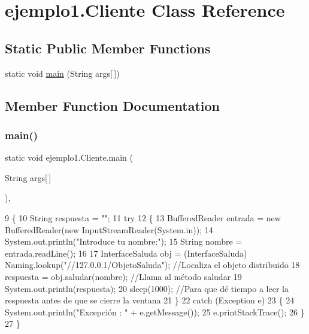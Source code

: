\hypertarget{classejemplo1_1_1_cliente}{}\section{ejemplo1.\+Cliente Class Reference}
\label{classejemplo1_1_1_cliente}
\subsection*{Static Public Member Functions}
\begin{DoxyCompactItemize}
\item 
static void \mbox{\hyperlink{classejemplo1_1_1_cliente_afc5408e295f1d2f02b6b7f6f8cf7d66b}{main}} (String args\mbox{[}$\,$\mbox{]})
\end{DoxyCompactItemize}


\subsection{Member Function Documentation}
\mbox{\label{classejemplo1_1_1_cliente_afc5408e295f1d2f02b6b7f6f8cf7d66b}} 
\subsubsection{\texorpdfstring{main()}{main()}}
{\footnotesize\ttfamily static void ejemplo1.\+Cliente.\+main (\begin{DoxyParamCaption}\item[{String}]{args\mbox{[}$\,$\mbox{]} }\end{DoxyParamCaption})\hspace{0.3cm}{\ttfamily [inline]}, {\ttfamily [static]}}


\begin{DoxyCode}
9     \{
10         String respuesta = \textcolor{stringliteral}{""};
11         \textcolor{keywordflow}{try}
12         \{
13             BufferedReader entrada = \textcolor{keyword}{new} BufferedReader(\textcolor{keyword}{new} InputStreamReader(System.in));
14             System.out.println(\textcolor{stringliteral}{"Introduce tu nombre:"});
15             String nombre = entrada.readLine();
16             
17             InterfaceSaluda obj = (InterfaceSaluda) Naming.lookup(\textcolor{stringliteral}{"//127.0.0.1/ObjetoSaluda"}); \textcolor{comment}{//Localiza
       el objeto distribuido}
18             respuesta = obj.saludar(nombre);                                                   \textcolor{comment}{//Llama al
       método saludar}
19             System.out.println(respuesta);
20             sleep(1000); \textcolor{comment}{//Para que dé tiempo a leer la respuesta antes de que se cierre la ventana}
21         \}
22         \textcolor{keywordflow}{catch} (Exception e)
23         \{
24             System.out.println(\textcolor{stringliteral}{"Excepción : "} + e.getMessage());
25             e.printStackTrace();
26         \}
27     \}
\end{DoxyCode}
